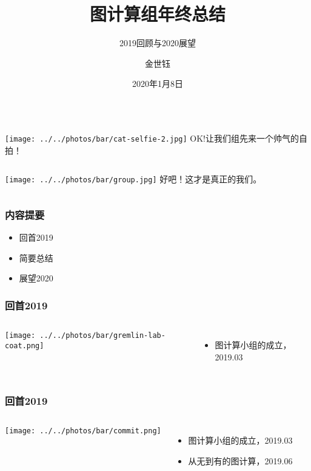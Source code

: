 \documentclass{beamer}
\title[总结]{图计算组年终总结}
\subtitle{2019回顾与2020展望}
\author{金世钰}
\date{2020年1月8日}
\begin{document}
\maketitle

  \begin{frame}
      \begin{columns}
       \texttt{[image: ../../photos/bar/cat-selfie-2.jpg]}
         OK!让我们组先来一个帅气的自拍！
      \end{columns}
  \end{frame}
  \begin{frame}
      \begin{columns}
       \texttt{[image: ../../photos/bar/group.jpg]}
        好吧！这才是真正的我们。
      \end{columns}
  \end{frame}

  \begin{frame}
  \frametitle{内容提要}
    \begin{itemize}
      \item{回首2019}
      \item{简要总结}
      \item{展望2020}
    \end{itemize}
  \end{frame}
  
  \begin{frame}
    \frametitle{回首2019}
  \begin{columns}
  \texttt{[image: ../../photos/bar/gremlin-lab-coat.png]}

  \begin{itemize}
  \item 图计算小组的成立，2019.03
  \end{itemize}
  \end{columns}

  \end{frame}
  
  \begin{frame}
    \frametitle{回首2019}
  \begin{columns}
  \texttt{[image: ../../photos/bar/commit.png]}

  \begin{itemize}
  \item 图计算小组的成立，2019.03
  \item 从无到有的图计算，2019.06
  \end{itemize}
  \end{columns}
  \end{frame}
\end{document}
